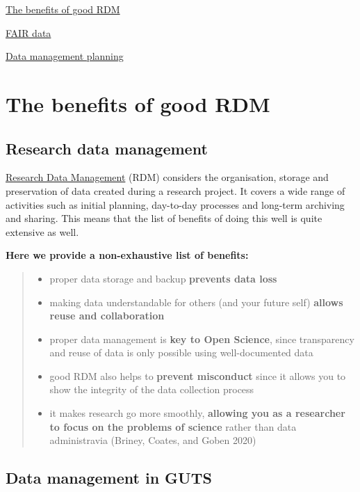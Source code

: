 \documentclass[
  letterpaper,
  DIV=11,
  numbers=noendperiod]{scrreprt}
\begin{document}
\href{benefits-rdm.qmd}{The benefits of good RDM}

\href{fair-data.qmd}{FAIR data}

\href{planning.qmd}{Data management planning}

\chapter{The benefits of good RDM}\label{the-benefits-of-good-rdm}

\section{Research data management}\label{research-data-management}

\href{https://the-turing-way.netlify.app/afterword/glossary.html\#term-Research-Data-Management}{Research
Data Management} (RDM) considers the organisation, storage and
preservation of data created during a research project. It covers a wide
range of activities such as initial planning, day-to-day processes and
long-term archiving and sharing. This means that the list of benefits of
doing this well is quite extensive as well.

\textbf{Here we provide a non-exhaustive list of benefits:}

\begin{quote}
\begin{itemize}
\item
  proper data storage and backup \textbf{prevents data loss}
\item
  making data understandable for others (and your future self)
  \textbf{allows reuse and collaboration}
\item
  proper data management is \textbf{key to Open Science}, since
  transparency and reuse of data is only possible using well-documented
  data
\item
  good RDM also helps to \textbf{prevent misconduct} since it allows you
  to show the integrity of the data collection process
\item
  it makes research go more smoothly, \textbf{allowing you as a
  researcher to focus on the problems of science} rather than data
  administravia (Briney, Coates, and Goben 2020)
\end{itemize}
\end{quote}

\section{Data management in GUTS}\label{data-management-in-guts}
\end{document}
